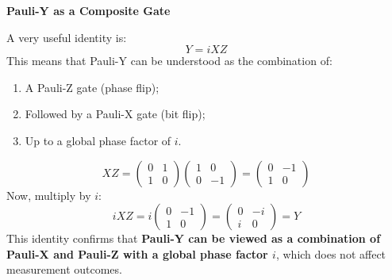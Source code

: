 \highspace
\begin{flushleft}
    \textcolor{Green3}{ \textbf{Pauli-Y as a Composite Gate}}
\end{flushleft}
A very useful identity is:
\begin{equation}
    Y = i X Z
\end{equation}
This means that Pauli-Y can be understood as the combination of:
\begin{enumerate}
    \item A Pauli-Z gate (phase flip);
    \item Followed by a Pauli-X gate (bit flip);
    \item Up to a global phase factor of $i$.
\end{enumerate}
\begin{equation*}
    XZ = \begin{pmatrix}
        0 & 1 \\ 1 & 0
    \end{pmatrix}
    \begin{pmatrix}
        1 & 0 \\ 0 & -1
    \end{pmatrix}
    =
    \begin{pmatrix}
        0 & -1 \\ 1 & 0
    \end{pmatrix}
\end{equation*}
Now, multiply by $i$:
\begin{equation*}
    iXZ = i \begin{pmatrix}
        0 & -1 \\ 1 & 0
    \end{pmatrix}
    =
    \begin{pmatrix}
        0 & -i \\ i & 0
    \end{pmatrix}
    = Y
\end{equation*}
This identity confirms that \textbf{Pauli-Y can be viewed as a combination of Pauli-X and Pauli-Z with a global phase factor $i$}, which does not affect measurement outcomes.

